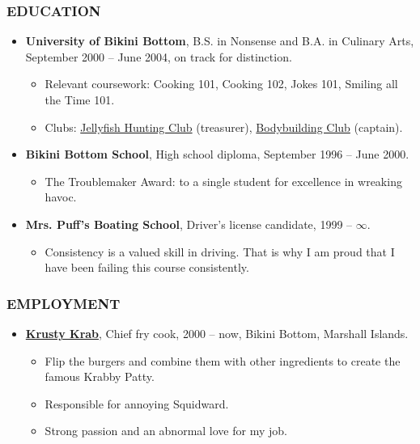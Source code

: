 \documentclass[11pt]{article}
\begin{document}
\subsubsection*{EDUCATION}
\begin{itemize}
    \item \textbf{University of Bikini Bottom}, B.S. in Nonsense and B.A. in Culinary Arts, September 2000 -- June 2004, on track for distinction. \begin{itemize}
    \item Relevant coursework: Cooking 101, Cooking 102, Jokes 101, Smiling all the Time 101.
    \item Clubs: \href{https://spongebob.fandom.com/wiki/SpongeBob_SquarePants_(character)}{Jellyfish Hunting Club} (treasurer), \href{https://spongebob.fandom.com/wiki/SpongeBob_SquarePants_(character)}{Bodybuilding Club} (captain).
    \end{itemize}
    \item \textbf{Bikini Bottom School}, High school diploma, September 1996 -- June 2000. \begin{itemize}
        \item The Troublemaker Award: to a single student for excellence in wreaking havoc.
    \end{itemize}
    \item \textbf{Mrs. Puff's Boating School}, Driver's license candidate, 1999 -- $\infty$. \begin{itemize}
        \item Consistency is a valued skill in driving. That is why I am proud that I have been failing this course consistently.
    \end{itemize}
\end{itemize}
\subsubsection*{EMPLOYMENT}
\begin{itemize}
    \item \textbf{\href{https://spongebob.fandom.com/wiki/Krusty_Krab}{Krusty Krab}}, Chief fry cook, 2000 -- now, Bikini Bottom, Marshall Islands. \begin{itemize}
        \item Flip the burgers and combine them with other ingredients to create the famous Krabby Patty.
        \item Responsible for annoying Squidward.
        \item Strong passion and an abnormal love for my job.
    \end{itemize}
\end{itemize}
\end{document}
